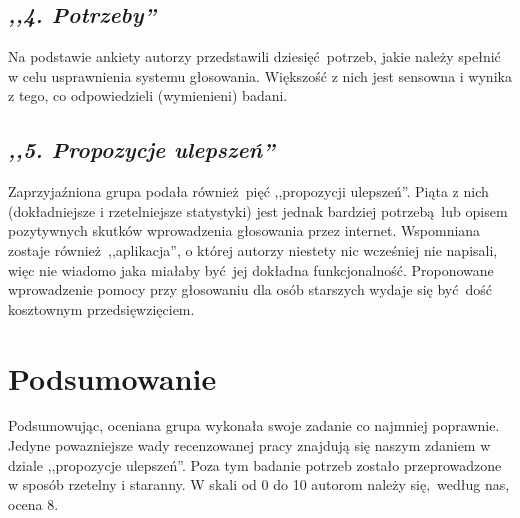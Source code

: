 \documentclass[12pt, a4paper, oneside]{article}
\begin{document}
\subsection*{\textit{,,4. Potrzeby''}}

Na podstawie ankiety autorzy przedstawili dziesięć potrzeb, jakie należy 
spełnić w celu usprawnienia systemu głosowania. Większość z nich jest sensowna 
i wynika z tego, co odpowiedzieli (wymienieni) badani.

\subsection*{\textit{,,5. Propozycje ulepszeń''}}

Zaprzyjaźniona grupa podała również pięć ,,propozycji ulepszeń''. Piąta z nich (dokładniejsze i rzetelniejsze statystyki) jest jednak bardziej potrzebą lub opisem  pozytywnych skutków wprowadzenia głosowania przez internet. Wspomniana 
zostaje również ,,aplikacja'', o której autorzy niestety nic wcześniej nie napisali, więc nie wiadomo jaka miałaby być jej dokładna funkcjonalność. Proponowane wprowadzenie pomocy przy głosowaniu dla osób starszych wydaje się być dość kosztownym przedsięwzięciem.

\section*{Podsumowanie}

Podsumowując, oceniana grupa wykonała swoje zadanie co najmniej poprawnie. 
Jedyne powazniejsze wady recenzowanej pracy znajdują się naszym zdaniem w 
dziale ,,propozycje ulepszeń''. Poza tym badanie potrzeb zostało przeprowadzone 
w sposób rzetelny i staranny. W skali od 0 do 10 autorom należy się, według nas,
ocena 8.
\end{document}
